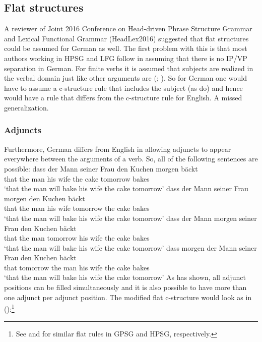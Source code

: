 \subsection{Flat structures}

A reviewer of Joint 2016 Conference on Head-driven Phrase Structure Grammar and Lexical Functional
Grammar (HeadLex2016) suggested that flat structures could be assumed for German as well. The
first problem with this is that most authors working in HPSG and LFG follow \citet{Haider93a}
in assuming that there is no IP/VP separation in German. For finite verbs it is assumed that
subjects are realized in the verbal domain just like other arguments are (\citealp[Section~3.2.2, Section~3.2.3]{Berman2003a}; \citealp[]{ZK2002a}). So for German one would
have to assume a c-structure rule that includes the subject (as \citealp[]{ZK2002a} do) and
hence would have a rule that differs from the c-structure rule for English. A missed generalization.



\subsubsection{Adjuncts}

\largerpage[2]
Furthermore, German differs from English in allowing adjuncts to appear everywhere between the
arguments of a verb. So, all of the following sentences are possible:
\eal
\ex 
\gll dass der Mann seiner Frau den Kuchen morgen bäckt\\
     that the man  his    wife the cake   tomorrow bakes\\
\glt `that the man will bake his wife the cake tomorrow'
\ex 
\gll dass der Mann seiner Frau morgen den Kuchen bäckt\\
     that the man  his    wife tomorrow the cake   bakes\\
\glt `that the man will bake his wife the cake tomorrow'
\ex 
\gll dass der Mann morgen seiner Frau den Kuchen bäckt\\
     that the man  tomorrow  his    wife the cake   bakes\\
\glt `that the man will bake his wife the cake tomorrow'
\ex 
\gll dass morgen der Mann seiner Frau den Kuchen bäckt\\
     that tomorrow the man  his    wife the cake    bakes\\
\glt `that the man will bake his wife the cake tomorrow'
\zl
As \citet{Uszkoreit87a} has shown, all adjunct positions can be filled simultaneously and it is also
possible to have more than one adjunct per adjunct position. The modified flat c-structure would
look as in ():\footnote{%
  See \citet[]{Uszkoreit87a} and \citet{Kasper94a} for similar flat rules in GPSG and HPSG,
  respectively.
}

